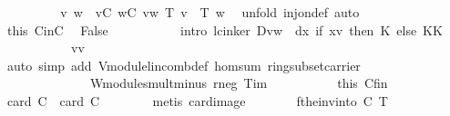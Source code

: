 \begin{isabellebody}
\ \ \ \ \ \ \isamarkupfalse%
\ \isamarkupfalse%
\ v\ w\ \ {\isachardoublequoteopen}v{\isasymin}C{\isachardoublequoteclose}\ {\isachardoublequoteopen}w{\isasymin}C{\isachardoublequoteclose}\ {\isachardoublequoteopen}v{\isasymnoteq}w{\isachardoublequoteclose}\ {\isachardoublequoteopen}T\ v\ {\isacharequal}\ T\ w{\isachardoublequoteclose}\ \isamarkupfalse%
\ {\isacharparenleft}unfold\ inj{\isacharunderscore}on{\isacharunderscore}def{\isacharcomma}\ auto{\isacharparenright}\ \isanewline
\ \ \ \ \ \ \isamarkupfalse%
\ this\ CinC\ \isamarkupfalse%
\ False\ \isanewline
\ \ \ \ \ \ \ \ \isamarkupfalse%
\ {\isacharparenleft}intro\ lc{\isacharunderscore}in{\isacharunderscore}ker{\isacharbrackleft}\ {\isacharquery}D{\isacharequal}{\isachardoublequoteopen}{\isacharbraceleft}v{\isacharcomma}w{\isacharbraceright}{\isachardoublequoteclose}\ \ {\isacharquery}d{\isacharequal}{\isachardoublequoteopen}{\isasymlambda}x{\isachardot}\ if\ x{\isacharequal}v\ then\ {\isasymone}\isactrlbsub K\isactrlesub \ else\ {\isasymominus}\isactrlbsub K\isactrlesub {\isasymone}\isactrlbsub K\isactrlesub {\isachardoublequoteclose}\isanewline
\ \ \ \ \ \ \ \ \ \ \ {\isacharquery}v{\isacharequal}{\isachardoublequoteopen}v{\isachardoublequoteclose}{\isacharbrackright}{\isacharparenright}\isanewline
\ \ \ \ \ \ \ \ \ \ \ \ \isamarkupfalse%
\ {\isacharparenleft}auto\ simp\ add{\isacharcolon}\ V{\isachardot}module{\isachardot}lincomb{\isacharunderscore}def\ hom{\isacharunderscore}sum\ ring{\isacharunderscore}subset{\isacharunderscore}carrier\ \isanewline
\ \ \ \ \ \ \ \ \ \ \ \ \ \ W{\isachardot}module{\isachardot}smult{\isacharunderscore}minus{\isacharunderscore}{}\ r{\isacharunderscore}neg\ T{\isacharunderscore}im{\isacharparenright}\isanewline
\ \ \ \ \isamarkupfalse%
\isanewline
\ \ \ \ \isamarkupfalse%
\ this\ Cfin\ \isamarkupfalse%
\ {\isachardoublequoteopen}card\ C\ {\isacharequal}\ card\ {\isacharquery}C{\isacharprime}{\isachardoublequoteclose}\isanewline
\ \ \ \ \ \ \isamarkupfalse%
\ {\isacharparenleft}metis\ card{\isacharunderscore}image{\isacharparenright}\ \isanewline
\ \ \isamarkupfalse%
\isanewline
\ \ \isamarkupfalse%
\ {\isacharquery}f{\isacharequal}{\isachardoublequoteopen}the{\isacharunderscore}inv{\isacharunderscore}into\ C\ T{\isachardoublequoteclose}\isanewline
\ \ \isamarkupfalse%

\end{isabellebody}
